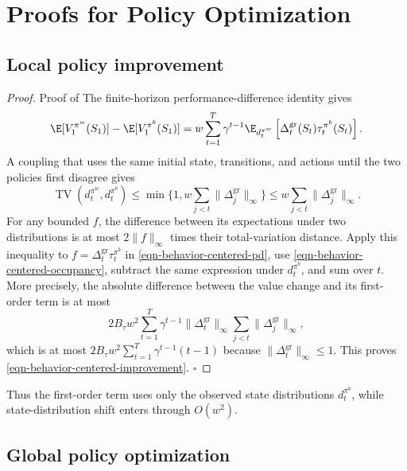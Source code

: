 \documentclass[opre,nonblindrev]{informs4}
\newenvironment{revision}{\begingroup\color{revisionblue}\ignorespaces}{\endgroup}
\newcommand{\norm}[1]{\lVert#1\rVert}
\newcommand{\blipadv}{\tau}
\newcommand{\boundadv}{B_\blipadv}
\renewcommand{\qed}{\unskip\nobreak\hfill\ensuremath{\square}}
\begin{document}
\section{Proofs for Policy Optimization}\label{sec-pol-opt}

\begin{revision}
\subsection{Local policy improvement}

\begin{proof}{Proof of }
The finite-horizon performance-difference identity gives
\begin{equation}
\E[V_1^{\pi^w}(S_1)]-\E[V_1^{\pi^b}(S_1)]
=
w\sum_{t=1}^T\gamma^{t-1}
\E_{d_t^{\pi^w}}
\left[\Delta_t^{\mathrm{gr}}(S_t)
\blipadv_t^{\pi^b}(S_t)\right].
\label{eqn-behavior-centered-pd}
\end{equation}
A coupling that uses the same initial state, transitions, and actions until
the two policies first disagree gives
\begin{equation}\textstyle 
\operatorname{TV}(d_t^{\pi^w},d_t^{\pi^b})
\leq
\min\{1,w\sum_{j<t}
\norm{\Delta_j^{\mathrm{gr}}}_\infty\}
\leq
w\sum_{j<t}\norm{\Delta_j^{\mathrm{gr}}}_\infty.
\label{eqn-behavior-centered-occupancy}
\end{equation}
For any bounded $f$, the difference between its expectations under two
distributions is at most $2\norm{f}_\infty$ times their total-variation
distance. Apply this inequality to
$f=\Delta_t^{\mathrm{gr}}\blipadv_t^{\pi^b}$ in
\eqref{eqn-behavior-centered-pd}, use
\eqref{eqn-behavior-centered-occupancy}, subtract the same expression under
$d_t^{\pi^b}$, and sum over $t$. More precisely, the absolute difference
between the value change and its first-order term is at most
\[
2\boundadv w^2
\sum_{t=1}^T\gamma^{t-1}
\norm{\Delta_t^{\mathrm{gr}}}_\infty
\sum_{j<t}\norm{\Delta_j^{\mathrm{gr}}}_\infty,
\]
which is at most
$2\boundadv w^2\sum_{t=1}^T\gamma^{t-1}(t-1)$ because
$\norm{\Delta_t^{\mathrm{gr}}}_\infty\leq1$. This proves
\eqref{eqn-behavior-centered-improvement}. \qed
\end{proof}

Thus the first-order term uses only the observed state distributions
$d_t^{\pi^b}$, while state-distribution shift enters through $O(w^2)$.
\end{revision}

\subsection{Global policy optimization}
\end{document}
